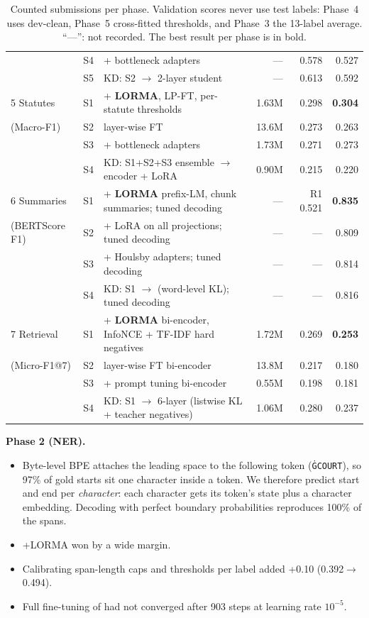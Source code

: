 \begin{table}[t]
\begin{tabularx}{\textwidth}{@{}l l X r r r@{}}
 & S4 & \D{} + bottleneck adapters & --- & 0.578 & 0.527 \\
 & S5 & KD: S2 $\rightarrow$ 2-layer \C{} student & --- & 0.613 & 0.592 \\\midrule
5 Statutes & S1 & \A{} + \textbf{LORMA}, LP-FT, per-statute thresholds & 1.63M & 0.298 & \textbf{0.304} \\
(Macro-F1) & S2 & \C{} layer-wise FT & 13.6M & 0.273 & 0.263 \\
 & S3 & \D{} + bottleneck adapters & 1.73M & 0.271 & 0.273 \\
 & S4 & KD: S1+S2+S3 ensemble $\rightarrow$ \B{} encoder + LoRA & 0.90M & 0.215 & 0.220 \\\midrule
6 Summaries & S1 & \A{} + \textbf{LORMA} prefix-LM, chunk summaries; tuned decoding & --- & R1 0.521 & \textbf{0.835} \\
(BERTScore F1) & S2 & \B{} + LoRA on all projections; tuned decoding & --- & --- & 0.809 \\
 & S3 & \D{} + Houlsby adapters; tuned decoding & --- & --- & 0.814 \\
 & S4 & KD: S1 $\rightarrow$ \C{} (word-level KL); tuned decoding & --- & --- & 0.816 \\\midrule
7 Retrieval & S1 & \A{} + \textbf{LORMA} bi-encoder, InfoNCE + TF-IDF hard negatives & 1.72M & 0.269 & \textbf{0.253} \\
(Micro-F1@7) & S2 & \C{} layer-wise FT bi-encoder & 13.8M & 0.217 & 0.180 \\
 & S3 & \D{} + prompt tuning bi-encoder & 0.55M & 0.198 & 0.181 \\
 & S4 & KD: S1 $\rightarrow$ 6-layer \A{} (listwise KL + teacher negatives) & 1.06M & 0.280 & 0.237 \\\bottomrule
\end{tabularx}
\caption{Counted submissions per phase. Validation scores never use test labels: Phase~4 uses dev-clean, Phase~5 cross-fitted thresholds, and Phase~3 the 13-label average. ``---'': not recorded. The best result per phase is in bold.}\label{tab:main}\vspace{-0.8em}
\end{table}

\textbf{Phase 2 (NER).}
\begin{itemize}
\item Byte-level BPE attaches the leading space to the following token (\texttt{\.GCOURT}), so 97\% of gold starts sit one character inside a token. We therefore predict start and end per \emph{character}: each character gets its token's state plus a character embedding. Decoding with perfect boundary probabilities reproduces 100\% of the spans.
\item \C{}+LORMA won by a wide margin.
\item Calibrating span-length caps and thresholds per label added +0.10 (0.392$\rightarrow$0.494).
\item Full fine-tuning of \A{} had not converged after 903 steps at learning rate $10^{-5}$.
\end{itemize}

